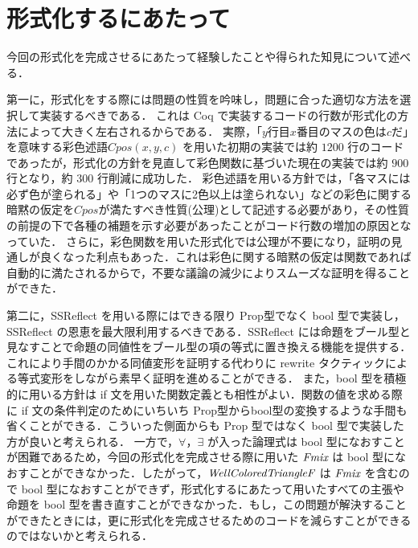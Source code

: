 \section{形式化するにあたって}

今回の形式化を完成させるにあたって経験したことや得られた知見について述べる．

第一に，形式化をする際には問題の性質を吟味し，問題に合った適切な方法を選択して実装するべきである．
これは Coq で実装するコードの行数が形式化の方法によって大きく左右されるからである．
実際，「$y$行目$x$番目のマスの色は$c$だ」を意味する彩色述語$Cpos(x,y,c)$ を用いた初期の実装では約 $1200$ 行のコードであったが，形式化の方針を見直して彩色関数に基づいた現在の実装では約 $900$ 行となり，約 $300$ 行削減に成功した．
彩色述語を用いる方針では，「各マスには必ず色が塗られる」や「1つのマスに2色以上は塗られない」などの彩色に関する暗黙の仮定を$Cpos$が満たすべき性質(公理)として記述する必要があり，その性質の前提の下で各種の補題を示す必要があったことがコード行数の増加の原因となっていた．
さらに，彩色関数を用いた形式化では公理が不要になり，証明の見通しが良くなった利点もあった．これは彩色に関する暗黙の仮定は関数であれば自動的に満たされるからで，不要な議論の減少によりスムーズな証明を得ることができた．

第二に，SSReflect を用いる際にはできる限り Prop型でなく bool 型で実装し，SSReflect の恩恵を最大限利用するべきである．SSReflect には命題をブール型と見なすことで命題の同値性をブール型の項の等式に置き換える機能を提供する．これにより手間のかかる同値変形を証明する代わりに rewrite タクティックによる等式変形をしながら素早く証明を進めることができる．
また，bool 型を積極的に用いる方針は if 文を用いた関数定義とも相性がよい．関数の値を求める際に if 文の条件判定のためにいちいち Prop型からbool型の変換するような手間も省くことができる．こういった側面からも Prop 型ではなく bool 型で実装した方が良いと考えられる．
一方で，$\forall$，$\exists$ が入った論理式は bool 型になおすことが困難であるため，今回の形式化を完成させる際に用いた $\textit{Fmix}$ は bool 型になおすことができなかった．したがって，$\textit{WellColoredTriangleF}$ は $\textit{Fmix}$ を含むので bool 型になおすことができず，形式化するにあたって用いたすべての主張や命題を bool 型を書き直すことができなかった．もし，この問題が解決することができたときには，更に形式化を完成させるためのコードを減らすことができるのではないかと考えられる．


